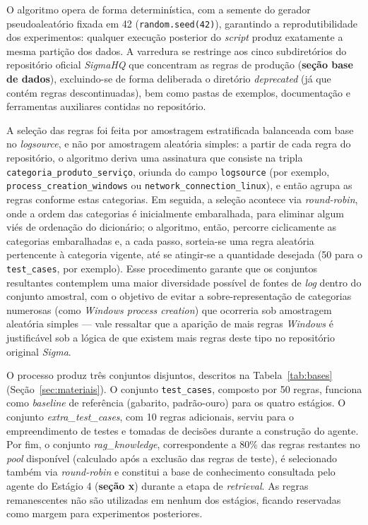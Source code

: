 O algoritmo opera de forma determinística, com a semente do gerador pseudoaleatório fixada em 42 (\texttt{random.seed(42)}), garantindo a reprodutibilidade dos experimentos: 
qualquer execução posterior do \textit{script} produz exatamente a mesma partição dos dados. 
A varredura se restringe aos cinco subdiretórios do repositório oficial \textit{SigmaHQ} que concentram as regras de produção (\textbf{seção base de dados}), excluindo-se de forma deliberada o diretório \textit{deprecated} (já que contém regras descontinuadas), bem como pastas de exemplos, documentação e ferramentas auxiliares contidas no repositório.

A seleção das regras foi feita por amostragem estratificada balanceada com base no \textit{logsource}, e não por amostragem aleatória simples: 
a partir de cada regra do repositório, o algoritmo deriva uma assinatura que consiste na tripla \texttt{categoria\_produto\_serviço}, oriunda do campo \texttt{logsource} (por exemplo, \texttt{process\_creation\_windows} ou \texttt{network\_connection\_linux}), e então agrupa as regras conforme estas categorias. 
Em seguida, a seleção acontece via \textit{round-robin}, onde a ordem das categorias é inicialmente embaralhada, para eliminar algum viés de ordenação do dicionário; 
o algoritmo, então, percorre ciclicamente as categorias embaralhadas e, a cada passo, sorteia-se uma regra aleatória pertencente à categoria vigente, até se atingir-se a quantidade desejada (50 para o \texttt{test\_cases}, por exemplo). 
Esse procedimento garante que os conjuntos resultantes contemplem uma maior diversidade possível de fontes de \textit{log} dentro do conjunto amostral, com o objetivo de evitar a sobre-representação de categorias numerosas (como \textit{Windows process creation}) que ocorreria sob amostragem aleatória simples --- vale ressaltar que a aparição de mais regras \textit{Windows} é justificável sob a lógica de que existem mais regras deste tipo no repositório original \textit{Sigma}.

O processo produz três conjuntos disjuntos, descritos na Tabela~\ref{tab:bases} (Seção~\ref{sec:materiais}). 
O conjunto \texttt{test\_cases}, composto por 50 regras, funciona como \textit{baseline} de referência (gabarito, padrão-ouro) para os quatro estágios. 
O conjunto \textit{extra\_test\_cases}, com 10 regras adicionais, serviu para o empreendimento de testes e tomadas de decisões durante a construção do agente. 
Por fim, o conjunto \textit{rag\_knowledge}, correspondente a 80\% das regras restantes no \textit{pool} disponível (calculado após a exclusão das regras de teste), é selecionado também via \textit{round-robin} e constitui a base de conhecimento consultada pelo agente do Estágio 4 (\textbf{seção x}) durante a etapa de \textit{retrieval}. 
As regras remanescentes não são utilizadas em nenhum dos estágios, ficando reservadas como margem para experimentos posteriores.

